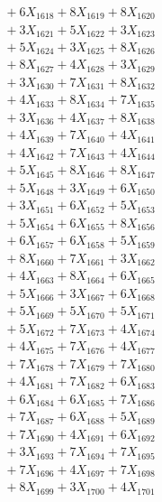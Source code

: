 \documentclass[a4paper,10pt]{article}
\begin{document}
{\begin{align}
&\;  + 6 X_{1618} + 8 X_{1619} + 8 X_{1620} \\[0.3ex]
&\;  + 3 X_{1621} + 5 X_{1622} + 3 X_{1623} \\[0.3ex]
&\;  + 5 X_{1624} + 3 X_{1625} + 8 X_{1626} \\[0.3ex]
&\;  + 8 X_{1627} + 4 X_{1628} + 3 X_{1629} \\[0.5ex]\allowbreak
&\;  + 3 X_{1630} + 7 X_{1631} + 8 X_{1632} \\[0.3ex]
&\;  + 4 X_{1633} + 8 X_{1634} + 7 X_{1635} \\[0.3ex]
&\;  + 3 X_{1636} + 4 X_{1637} + 8 X_{1638} \\[0.3ex]
&\;  + 4 X_{1639} + 7 X_{1640} + 4 X_{1641} \\[0.3ex]
&\;  + 4 X_{1642} + 7 X_{1643} + 4 X_{1644} \\[0.3ex]
&\;  + 5 X_{1645} + 8 X_{1646} + 8 X_{1647} \\[0.3ex]
&\;  + 5 X_{1648} + 3 X_{1649} + 6 X_{1650} \\[0.3ex]
&\;  + 3 X_{1651} + 6 X_{1652} + 5 X_{1653} \\[0.3ex]
&\;  + 5 X_{1654} + 6 X_{1655} + 8 X_{1656} \\[0.3ex]
&\;  + 6 X_{1657} + 6 X_{1658} + 5 X_{1659} \\[0.5ex]\allowbreak
&\;  + 8 X_{1660} + 7 X_{1661} + 3 X_{1662} \\[0.3ex]
&\;  + 4 X_{1663} + 8 X_{1664} + 6 X_{1665} \\[0.3ex]
&\;  + 5 X_{1666} + 3 X_{1667} + 6 X_{1668} \\[0.3ex]
&\;  + 5 X_{1669} + 5 X_{1670} + 5 X_{1671} \\[0.3ex]
&\;  + 5 X_{1672} + 7 X_{1673} + 4 X_{1674} \\[0.3ex]
&\;  + 4 X_{1675} + 7 X_{1676} + 4 X_{1677} \\[0.3ex]
&\;  + 7 X_{1678} + 7 X_{1679} + 7 X_{1680} \\[0.3ex]
&\;  + 4 X_{1681} + 7 X_{1682} + 6 X_{1683} \\[0.3ex]
&\;  + 6 X_{1684} + 6 X_{1685} + 7 X_{1686} \\[0.3ex]
&\;  + 7 X_{1687} + 6 X_{1688} + 5 X_{1689} \\[0.5ex]\allowbreak
&\;  + 7 X_{1690} + 4 X_{1691} + 6 X_{1692} \\[0.3ex]
&\;  + 3 X_{1693} + 7 X_{1694} + 7 X_{1695} \\[0.3ex]
&\;  + 7 X_{1696} + 4 X_{1697} + 7 X_{1698} \\[0.3ex]
&\;  + 8 X_{1699} + 3 X_{1700} + 4 X_{1701} \\[0.3ex]

\end{align}}
\end{document}
